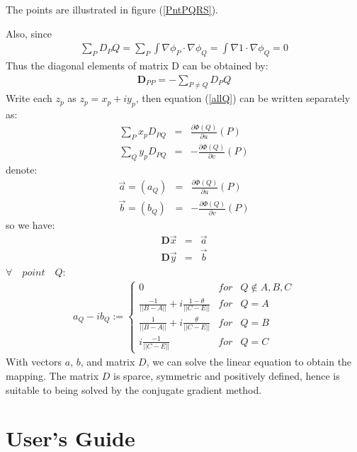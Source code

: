 \documentclass{InsightArticle}
\begin{document}
  The points are illustrated in figure (\ref{PntPQRS}).  
  
  Also, since
  \begin{eqnarray}  
    \sum_P D_PQ = \sum_P \int \nabla \phi_P \cdot \nabla \phi_Q = \int \nabla 1 \cdot \nabla \phi_Q = 0
  \end{eqnarray}
  Thus the diagonal elements of matrix D can be obtained by:
  \begin{eqnarray}
    \mathbf{D}_{PP} = -\sum_{P \ne Q}D_PQ \label{diagonalOfD}
  \end{eqnarray}    
  Write each $z_p$ as $z_p=x_p + iy_p$, then
  equation (\ref{allQ}) can be written separately as:
  \begin{eqnarray}
    \sum_{P}x_p D_{PQ} &=& \frac{\partial \Phi(Q)}{\partial u}(P) \nonumber\\
    \sum_{Q}y_p D_{PQ} &=& -\frac{\partial \Phi(Q)}{\partial v} (P)
  \end{eqnarray}  
  denote:
  \begin{eqnarray}
    \vec{a} = (a_Q) &=& \frac{\partial \Phi(Q)}{\partial u}(P) \nonumber \\
    \vec{b} = (b_Q) &=& -\frac{\partial \Phi(Q)}{\partial v} (P)
  \end{eqnarray}  
  so we have:
  \begin{eqnarray}
    \mathbf{D}\vec{x} &=& \vec{a} \nonumber \\
    \mathbf{D}\vec{y} &=& \vec{b} \label{z}
  \end{eqnarray}    
  $\forall \quad point \quad Q$:
  \begin{eqnarray}
    a_Q - ib_Q := \left\{
    \begin{array}{lcl}
      0 & for & Q \notin {A, B, C} \\
      \frac{-1}{||B-A||} + i\frac{1-\theta}{||C-E||} & for & Q = A \\
      \frac{1}{||B-A||} + i\frac{\theta}{||C-E||} & for & Q = B \\
      i\frac{-1}{||C-E||} & for & Q = C
    \end{array} \right. \label{ab}
  \end{eqnarray}      
	With vectors $a$, $b$, and matrix $D$, we can solve the linear
	equation to obtain the mapping. The matrix $D$ is sparce, symmetric
	and positively defined, hence is suitable to being solved by the
	conjugate gradient method.

	\section{User's Guide}
\end{document}
